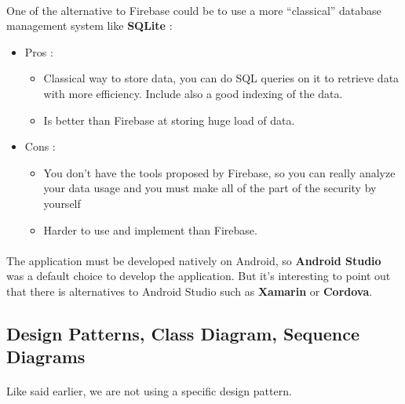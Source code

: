 \documentclass[paper=a4, fontsize=12pt,DIV=14]{scrartcl}    %
\begin{document}
				\paragraph{}One of the alternative to Firebase could be to use a more “classical” database management system like \textbf{SQLite} :
				\begin{itemize}
					\item Pros :
						\begin{itemize}
							\item	Classical way to store data, you can do SQL queries on it to retrieve data with more efficiency. Include also a good indexing of the data.
							\item	Is better than Firebase at storing huge load of data.
						\end{itemize}
					\item Cons :
						\begin{itemize}
							\item	You don’t have the tools proposed by Firebase, so you can really analyze your data usage and you must make all of the part of the security by yourself
							\item	Harder to use and implement than Firebase.
						\end{itemize}
				\end{itemize}

				\paragraph{}The application must be developed natively on Android, so \textbf{Android Studio} was a default choice to develop the application. But it's interesting to point out that there is alternatives to Android Studio such as \textbf{Xamarin} or \textbf{Cordova}.

			\subsection{Design Patterns, Class Diagram, Sequence Diagrams}

				\paragraph{}Like said earlier, we are not using a specific design pattern.
\end{document}
